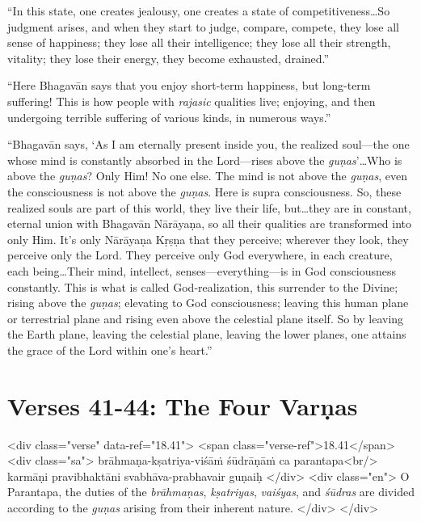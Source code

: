 \enquote{In this state, one creates jealousy, one creates a state of competitiveness\ldots So judgment arises, and when they start to judge, compare, compete, they lose all sense of happiness; they lose all their intelligence; they lose all their strength, vitality; they lose their energy, they become exhausted, drained.}

\enquote{Here Bhagavān says that you enjoy short-term happiness, but long-term suffering! This is how people with \textit{rajasic} qualities live; enjoying, and then undergoing terrible suffering of various kinds, in numerous ways.}

\enquote{Bhagavān says, \enquote{As I am eternally present inside you, the realized soul---the one whose mind is constantly absorbed in the Lord---rises above the \textit{guṇas}}\ldots Who is above the \textit{guṇas}? Only Him! No one else. The mind is not above the \textit{guṇas}, even the consciousness is not above the \textit{guṇas}. Here is supra consciousness. So, these realized souls are part of this world, they live their life, but\ldots they are in constant, eternal union with Bhagavān Nārāyaṇa, so all their qualities are transformed into only Him. It’s only Nārāyaṇa Kṛṣṇa that they perceive; wherever they look, they perceive only the Lord. They perceive only God everywhere, in each creature, each being\ldots Their mind, intellect, senses---everything---is in God consciousness constantly. This is what is called God-realization, this surrender to the Divine; rising above the \textit{guṇas}; elevating to God consciousness; leaving this human plane or terrestrial plane and rising even above the celestial plane itself. So by leaving the Earth plane, leaving the celestial plane, leaving the lower planes, one attains the grace of the Lord within one’s heart.}

\section{Verses 41-44: The Four Varṇas}\label{sec-verses-41-44-the-four-varnas}


\begin{html}
<div class="verse" data-ref="18.41">
  <span class="verse-ref">18.41</span>
  <div class="sa">
    brāhmaṇa-kṣatriya-viśāṁ śūdrāṇāṁ ca parantapa<br/>
    karmāṇi pravibhaktāni svabhāva-prabhavair guṇaiḥ
  </div>
  <div class="en">
    O Parantapa, the duties of the \textit{brāhmaṇas}, \textit{kṣatriyas}, \textit{vaiśyas}, and \textit{śūdras} are divided according to the \textit{guṇas} arising from their inherent nature.
  </div>
</div>
\end{html}



